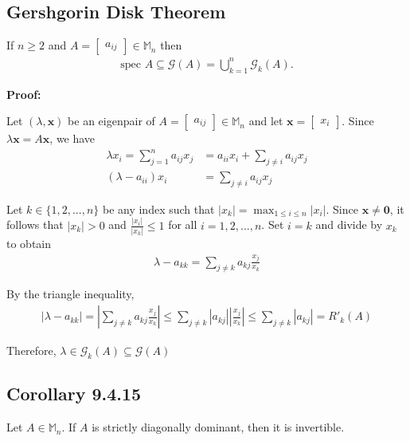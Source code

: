 \documentclass[12pt, letterpaper]{article}
\begin{document}
\newpage
\subsection{Gershgorin Disk Theorem}
If $n \ge 2$ and $A=\begin{bmatrix}
    a_{ij}
\end{bmatrix} \in \mathbb{M}_n$ then
\begin{align*}
    \text{spec } A \subseteq \mathcal{G}(A)= \bigcup^n_{k=1} \mathcal{G}_k(A).
\end{align*}

\noindent\textbf{Proof:}

Let $(\lambda,\mathbf{x})$ be an eigenpair of $A = \begin{bmatrix}
a_{ij} 
\end{bmatrix} \in \mathbb{M}_n$ and let $\mathbf{x}=\begin{bmatrix}
    x_i
\end{bmatrix}$. Since $\lambda \mathbf{x}=A\mathbf{x}$, we have
\begin{align*}
    \lambda x_i = \displaystyle\sum^n_{j=1} a_{ij}x_j &= a_{ii}x_i+\displaystyle\sum_{j\ne i} a_{ij}x_j \\
    (\lambda - a_{ii})x_i &= \displaystyle\sum_{j\ne i} a_{ij}x_j 
\end{align*}

Let $k \in \{ 1,2,...,n \}$ be any index such that $|x_k|=\max_{1\le i \le n} |x_i|$. Since $\mathbf{x} \ne \mathbf{0}$, 
it follows that $|x_k|>0$ and $\frac{|x_i|}{|x_k|}\le 1$ for all $i = 1,2,...,n$. Set $i = k$ and divide by $x_k$ to obtain
\begin{align*}
    \lambda - a_{kk} = \displaystyle\sum_{j\ne k} a_{kj} \frac{x_j}{x_k}
\end{align*}

By the triangle inequality,
\begin{align*}
    |\lambda-a_{kk}|=\left| \displaystyle\sum_{j\ne k}a_{kj}\frac{x_j}{x_k} \right| \le \sum_{j\ne k} |a_{kj}| \left| \frac{x_j}{x_k} \right| \le \sum_{j\ne k} |a_{kj}| = R'_k(A)
\end{align*}

Therefore, $\lambda \in \mathcal{G}_k(A)\subseteq \mathcal{G}(A)$

\subsection{Corollary 9.4.15}
Let $A\in \mathbb{M}_n$. If $A$ is strictly diagonally dominant, then it is invertible. \\
\end{document}
